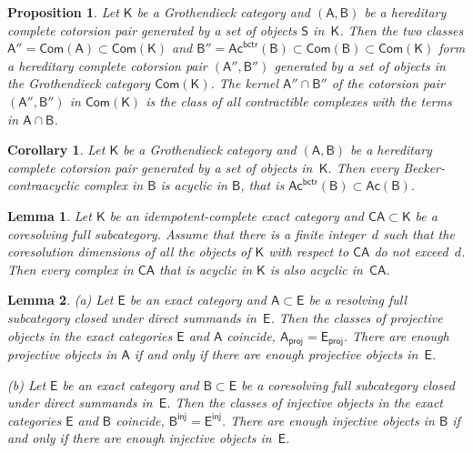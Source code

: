 \documentclass[10pt,a4paper]{amsart}
\newtheorem{lem}{Lemma}
\newtheorem{prop}{Proposition}
\newtheorem{cor}{Corollary}
\newcommand{\Ac}{\mathsf{Ac}}
\newcommand{\CA}{\mathsf{CA}}
\newcommand{\Com}{\mathsf{Com}}
\newcommand{\bctr}{\mathsf{bctr}}
\newcommand{\inj}{\mathsf{inj}}
\newcommand{\proj}{\mathsf{proj}}
\newcommand{\sA}{\mathsf A}
\newcommand{\sB}{\mathsf B}
\newcommand{\sE}{\mathsf E}
\newcommand{\sK}{\mathsf K}
\newcommand{\sS}{\mathsf S}
\begin{document}
\begin{prop} \label{all-contraacyclic-cotorsion-pair-prop}
 Let\/ $\sK$ be a Grothendieck category and $(\sA,\sB)$ be
a hereditary complete cotorsion pair generated by a set of objects\/
$\sS$ in\/~$\sK$.
 Then the two classes\/ $\sA''=\Com(\sA)\subset\Com(\sK)$ and $\sB''=
\Ac^\bctr(\sB)\subset\Com(\sB)\subset\Com(\sK)$ form a hereditary
complete cotorsion pair $(\sA'',\sB'')$ generated by a set of objects
in the Grothendieck category\/ $\Com(\sK)$.
 The kernel\/ $\sA''\cap\sB''$ of the cotorsion pair $(\sA'',\sB'')$
in\/ $\Com(\sK)$ is the class of all contractible complexes with
the terms in\/ $\sA\cap\sB$.
\end{prop}

\begin{cor} \label{contraacyclic-in-B-are-acyclic-in-B}
 Let\/ $\sK$ be a Grothendieck category and $(\sA,\sB)$ be a hereditary
complete cotorsion pair generated by a set of objects in\/~$\sK$.
 Then every Becker-contraacyclic complex in\/ $\sB$ is acyclic in\/
$\sB$, that is\/ $\Ac^\bctr(\sB)\subset\Ac(\sB)$.
\end{cor}

\begin{lem} \label{finite-coresol-dim-periodicity}
 Let\/ $\sK$ be an idempotent-complete exact category and\/
$\CA\subset\sK$ be a coresolving full subcategory.
 Assume that there is a finite integer~$d$ such that the coresolution
dimensions of all the objects of\/ $\sK$ with respect to\/ $\CA$ do
not exceed~$d$.
 Then every complex in\/ $\CA$ that is acyclic in\/ $\sK$ is also
acyclic in\/~$\CA$.
\end{lem}

\begin{lem} \label{proj-resolving-inj-coresolving}
\textup{(a)} Let\/ $\sE$ be an exact category and\/ $\sA\subset\sE$
be a resolving full subcategory closed under direct summands in\/~$\sE$.
 Then the classes of projective objects in the exact categories\/ $\sE$
and\/ $\sA$ coincide, $\sA_\proj=\sE_\proj$.
 There are enough projective objects in\/ $\sA$ if and only if
there are enough projective objects in\/~$\sE$. \par
\textup{(b)} Let\/ $\sE$ be an exact category and\/ $\sB\subset\sE$ be
a coresolving full subcategory closed under direct summands in\/~$\sE$.
 Then the classes of injective objects in the exact categories\/ $\sE$
and\/ $\sB$ coincide, $\sB^\inj=\sE^\inj$.
 There are enough injective objects in\/ $\sB$ if and only if
there are enough injective objects in\/~$\sE$.
\end{lem}
\end{document}
